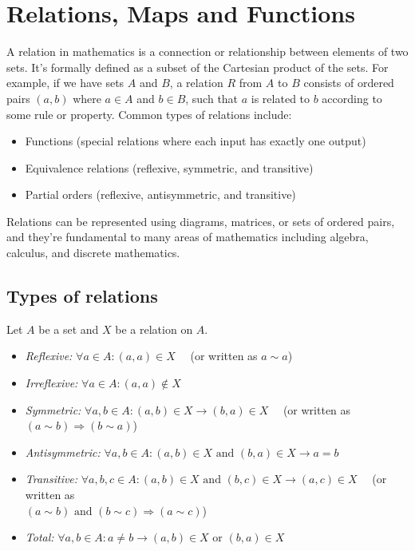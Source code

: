 \newpage
\section{Relations, Maps and Functions}

A relation in mathematics is a connection or relationship between elements of two sets. It's formally
defined as a subset of the Cartesian product of the sets.
\newline
For example, if we have sets \(A\) and \(B\), a relation \(R\) from \(A\) to \(B\) consists
of ordered pairs \((a,b)\) where \(a \in A\) and \(b \in B\), such that \(a\) is related to \(b\) according to some rule or property.
\newline
Common types of relations include:
\begin{itemize}[label =\(-\)]
	\item Functions (special relations where each input has exactly one output)
	\item Equivalence relations (reflexive, symmetric, and transitive)
	\item Partial orders (reflexive, antisymmetric, and transitive)
\end{itemize}

Relations can be represented using diagrams, matrices, or sets of
ordered pairs, and they're fundamental to many areas of mathematics including algebra, calculus, and discrete mathematics.

\subsection{Types of relations}

Let \(A\) be a set and \(X\) be a relation on \(A\).

\begin{itemize}[label =\(-\)]
	\item \emph{Reflexive:} \(\forall a \in A: (a, a) \in X\) \ \ (or written as \(a \sim a\))

	\item \emph{Irreflexive:} \(\forall a \in A: (a, a) \not\in X\)

	\item \emph{Symmetric:} \(\forall a, b \in A: (a, b) \in X \to (b, a) \in X\) \ \ (or written as \((a \sim b) \Rightarrow (b \sim a)\))

	\item \emph{Antisymmetric:} \(\forall a, b \in A: (a, b) \in X \text{ and } (b, a) \in X \to a = b\)

	\item \emph{Transitive:} \(\forall a, b, c \in A: (a, b) \in X \text{ and } (b, c) \in X \to (a, c) \in X\) \ \ (or written as \\\((a \sim b) \text{ and } (b \sim c) \Rightarrow (a \sim c)\))

	\item \emph{Total:} \(\forall a,b \in A: a \neq b \to (a, b) \in X \text{ or } (b, a) \in X\)
\end{itemize}

